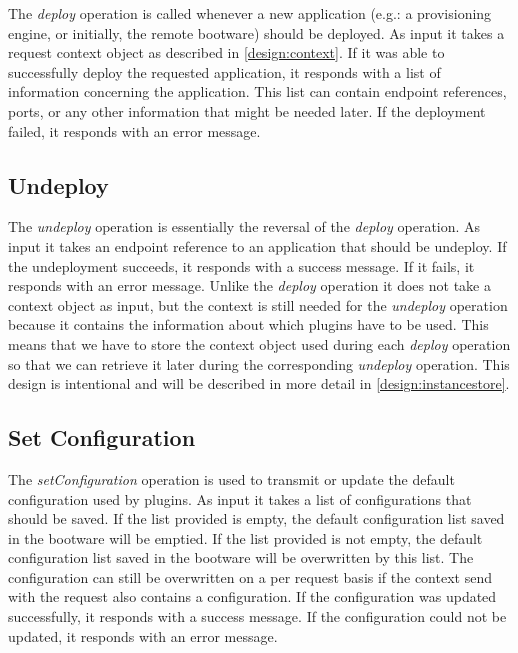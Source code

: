 The \textit{deploy} operation is called whenever a new application (e.g.: a provisioning engine, or initially, the remote bootware) should be deployed.
As input it takes a request context object as described in \autoref{design:context}.
If it was able to successfully deploy the requested application, it responds with a list of information concerning the application.
This list can contain endpoint references, ports, or any other information that might be needed later.
If the deployment failed, it responds with an error message.

\subsection{Undeploy}

The \textit{undeploy} operation is essentially the reversal of the \textit{deploy} operation.
As input it takes an endpoint reference to an application that should be undeploy.
If the undeployment succeeds, it responds with a success message.
If it fails, it responds with an error message.
Unlike the \textit{deploy} operation it does not take a context object as input, but the context is still needed for the \textit{undeploy} operation because it contains the information about which plugins have to be used.
This means that we have to store the context object used during each \textit{deploy} operation so that we can retrieve it later during the corresponding \textit{undeploy} operation.
This design is intentional and will be described in more detail in \autoref{design:instancestore}.

\subsection{Set Configuration}

The \textit{setConfiguration} operation is used to transmit or update the default configuration used by plugins.
As input it takes a list of configurations that should be saved.
If the list provided is empty, the default configuration list saved in the bootware will be emptied.
If the list provided is not empty, the default configuration list saved in the bootware will be overwritten by this list.
The configuration can still be overwritten on a per request basis if the context send with the request also contains a configuration.
If the configuration was updated successfully, it responds with a success message.
If the configuration could not be updated, it responds with an error message.

